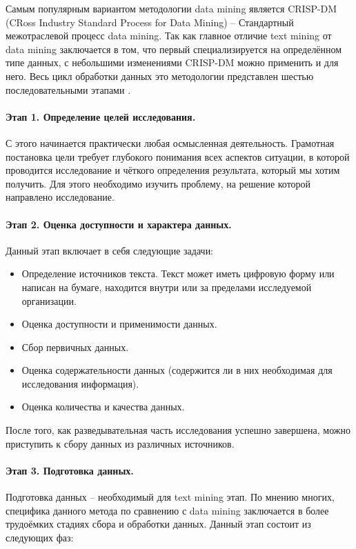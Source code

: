 Самым популярным вариантом методологии data mining является CRISP-DM (CRoss Industry Standard Process for Data Mining) -- Стандартный межотраслевой процесс data mining. Так как главное отличие text mining от data mining заключается в том, что первый специализируется на определённом типе данных, с небольшими изменениями CRISP-DM можно применить и для него. Весь цикл обработки данных это методологии представлен шестью последовательными этапами \cite[стр. 74]{practical_tm}.

\paragraph{Этап 1. Определение целей исследования.} С этого начинается практически любая осмысленная деятельность. Грамотная постановка цели требует глубокого понимания всех аспектов ситуации, в которой проводится исследование и чёткого определения результата, который мы хотим получить. Для этого необходимо изучить проблему, на решение которой направлено исследование.

\paragraph{Этап 2. Оценка доступности и характера данных.} Данный этап включает в себя следующие задачи: 
	\begin{itemize}
	\item Определение источников текста. Текст может иметь цифровую форму или написан на бумаге, находится внутри или за пределами исследуемой организации.
	\item Оценка доступности и применимости данных.
	\item Сбор первичных данных.
	\item Оценка содержательности данных (содержится ли в них необходимая для исследования информация).
	\item Оценка количества и качества данных. 
	\end{itemize}

После того, как разведывательная часть исследования успешно завершена, можно приступить к сбору данных из различных источников.

\paragraph{Этап 3. Подготовка данных.} Подготовка данных -- необходимый для text mining этап. По мнению многих, специфика данного метода по сравнению с data mining заключается в более трудоёмких стадиях сбора и обработки данных\cite[стр. 77]{practical_tm}. Данный этап состоит из следующих фаз:

